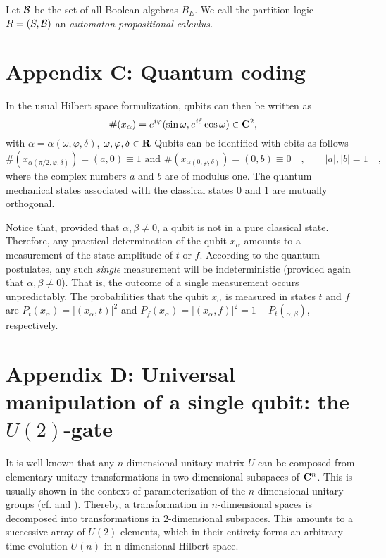 \documentclass [11pt]{llncs}
\begin{document}
Let ${\cal B}$ be the set of all Boolean algebras $B_E$.
We call the partition logic $R= (S,{\cal B})$ an {\em automaton
propositional calculus.}




\section*{Appendix C: Quantum coding}
 \label{appendix-C}
In the usual Hilbert space formulization,
qubits can then be written as
\begin{equation}
\# (x_{\alpha })  = e^{i\varphi } (\sin \omega  ,e^{i\delta } \cos \omega )\in {\bf C}^2  ,
\end{equation}
with
$\alpha=\alpha (\omega ,\varphi ,\delta)$, $\omega ,\varphi ,\delta \in {\bf R}$
Qubits can be identified with cbits as follows
\begin{equation}
\# (x_{\alpha(\pi/2, \varphi,\delta)})=(a,0)\equiv 1
\mbox{ and }
\# (x_{\alpha(0, \varphi,\delta)})=(0,b)\equiv 0
\quad , \qquad
\vert a\vert,
\vert b\vert =1\quad ,
\end{equation}
where the complex numbers $a$ and $b$ are of modulus one.
The quantum mechanical  states associated with the classical states $0$
and $1$ are mutually orthogonal.


Notice that, provided that $\alpha,\beta \neq 0$, a
qubit is not in a pure classical state. Therefore,
any practical determination of the qubit $x_{\alpha  }$
amounts to a measurement of the state amplitude of $t$ or $f$.
According to the quantum postulates,
any such {\em single} measurement will be
indeterministic (provided again that $\alpha,\beta \neq 0$). That is,
the outcome of a single measurement occurs unpredictably.
The probabilities
that the qubit $x_{\alpha  }$ is measured in states $t$
and
$f$ are
$P_t(x_{\alpha })=
\vert (x_{\alpha  },t)\vert^2
$ and
$P_f(x_{\alpha  })=
\vert (x_{\alpha  },f)\vert^2
=1-P_t(_{\alpha ,\beta })
$, respectively.




\section*{Appendix D: Universal manipulation of a single qubit: the $U(2)$-gate}

 \label{appendix-d}

It is well known that
any $n$-dimensional unitary matrix $U$ can be composed from elementary
unitary transformations in two-dimensional subspaces of ${\bf C}^n$.
This is usually shown in the context of parameterization of the
$n$-dimensional unitary groups
(cf. \cite[chapter 2]{murnaghan} and
\cite{rzbb,reck-94}).
Thereby, a transformation in $n$-dimensional spaces is decomposed into
transformations in $2$-dimensional subspaces.
This amounts to a
successive array of $U(2)$ elements, which in their entirety forms an
arbitrary time evolution
$U(n)$ in n-dimensional Hilbert space.
\end{document}
